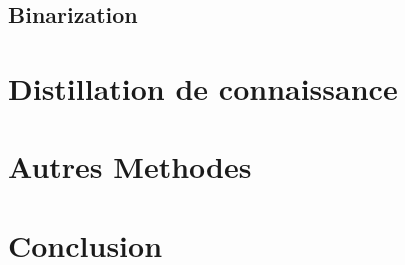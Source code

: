 \documentclass[twoside,twocolumn]{article}
\begin{document}
\subsection{Binarization}

\section{Distillation de connaissance} %


\section{Autres Methodes}%


\section{Conclusion}%



 

\end{document}
